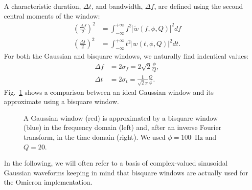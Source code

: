 A characteristic duration, $\Delta t$, and bandwidth, $\Delta f$, are defined using the second central moments of the window:
\begin{align}
  \left(\frac{\Delta f}{2}\right)^2 &= \int_{-\infty}^{+\infty}{f^2|\tilde{w}(f,\phi,Q)|^2 df}\\
  \left(\frac{\Delta t}{2}\right)^2 &= \int_{-\infty}^{+\infty}{t^2|w(t,\phi,Q)|^2 dt}.
\end{align}
For both the Gaussian and bisquare windows, we naturally find indentical values:
\begin{align}
  \Delta f &=  2\sigma_f = 2\sqrt{2}\frac{\phi}{Q}, \\ 
  \Delta t &=  2\sigma_t = \frac{1}{\sqrt{2}\pi}\frac{Q}{\phi}.
\end{align}
Fig.~\ref{fig:window} shows a comparison between an ideal Gaussian window and its approximate using a bisquare window.
\begin{figure}
  \center
  \caption{A Gaussian window (red) is approximated by a bisquare window (blue) in the frequency domain (left) and, after an inverse Fourier transform, in the time domain (right). We used $\phi=100$~Hz and $Q=20$.}
  \label{fig:window}
\end{figure}

In the following, we will often refer to a basis of complex-valued sinusoidal Gaussian waveforms keeping in mind that bisquare windows are actually used for the Omicron implementation.


